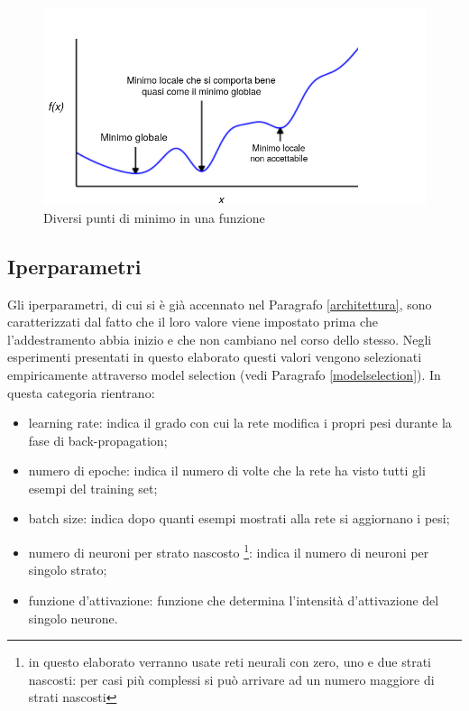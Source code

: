 \documentclass[12pt]{report}
\begin{document}
\begin{figure}[H]
\begin{center}
\includegraphics[scale=0.5]{localMinima.png}
\caption{Diversi punti di minimo in una funzione}
\label{localMinima}
\end{center}
\end{figure}

\subsection{Iperparametri}\label{iperparametri}
Gli iperparametri, di cui si è già accennato nel Paragrafo \ref{architettura}, sono caratterizzati dal fatto che il loro valore viene impostato prima che l'addestramento abbia inizio e che non cambiano nel corso dello stesso. Negli esperimenti presentati in questo elaborato questi valori vengono selezionati empiricamente attraverso model selection (vedi Paragrafo \ref{modelselection}).
In questa categoria rientrano:
\begin{itemize}
\item{learning rate}: indica il grado con cui la rete modifica i propri pesi durante la fase di back-propagation;
\item{numero di epoche}: indica il numero di volte che la rete ha visto tutti gli esempi del training set;
\item{batch size}: indica dopo quanti esempi mostrati alla rete si aggiornano i pesi;
\item{numero di neuroni per strato nascosto \footnote{in questo elaborato verranno usate reti neurali con zero, uno e due strati nascosti: per casi più complessi si può arrivare ad un numero maggiore di strati nascosti}}: indica il numero di neuroni per singolo strato;
\item{funzione d'attivazione}: funzione che determina l'intensità d'attivazione del singolo neurone.
\end{itemize}
\end{document}

